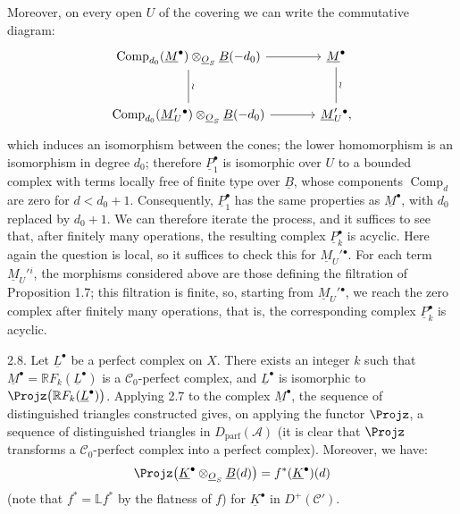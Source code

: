 Moreover, on every open $U$ of the covering we can write the commutative diagram:
\[
\begin{tikzcd}[column sep=large,row sep=large]
\operatorname{Comp}_{d_0}(\underline{M}^{\bullet})\otimes_{\underline{O}_S}\underline{B}(-d_0) \arrow[r] \arrow[d,dash,"\wr"] & \underline{M}^{\bullet} \arrow[d,dash,"\wr"]\\
\operatorname{Comp}_{d_0}(\underline{M}_U'{}^{\bullet})\otimes_{\underline{O}_S}\underline{B}(-d_0) \arrow[r] & \underline{M}_U'{}^{\bullet},
\end{tikzcd}
\]
which induces an isomorphism between the cones; the lower homomorphism is an isomorphism in degree $d_0$; therefore $\underline{P}_1^{\bullet}$ is isomorphic over $U$ to a bounded complex with terms locally free of finite type over $\underline{B}$, whose components $\operatorname{Comp}_d$ are zero for $d<d_0+1$. Consequently, $\underline{P}_1^{\bullet}$ has the same properties as $\underline{M}^{\bullet}$, with $d_0$ replaced by $d_0+1$. We can therefore iterate the process, and it suffices to see that, after finitely many operations, the resulting complex $\underline{P}_k^{\bullet}$ is acyclic. Here again the question is local, so it suffices to check this for $\underline{M}_U'{}^{\bullet}$. For each term $\underline{M}_U'{}^i$, the morphisms considered above are those defining the filtration of Proposition 1.7; this filtration is finite, so, starting from $\underline{M}_U'{}^{\bullet}$, we reach the zero complex after finitely many operations, that is, the corresponding complex $\underline{P}_k^{\bullet}$ is acyclic.

%
2.8.
Let $\underline{L}^{\bullet}$ be a perfect complex on $X$. There exists an integer $k$ such that $\underline{M}^{\bullet}=\mathbb R F_k(\underline{L}^{\bullet})$ is a $\mathcal C_0$-perfect complex, and $\underline{L}^{\bullet}$ is isomorphic to $\Projz\bigl(\mathbb R F_k(\underline{L}^{\bullet})\bigr)$. Applying 2.7 to the complex $\underline{M}^{\bullet}$, the sequence of distinguished triangles constructed gives, on applying the functor $\Projz$, a sequence of distinguished triangles in $D_{\mathrm{parf}}(\mathcal A)$ (it is clear that $\Projz$ transforms a $\mathcal C_0$-perfect complex into a perfect complex). Moreover, we have:
\[
  \Projz\bigl(\underline{K}^{\bullet}\otimes_{\underline{O}_S}\underline{B}(d)\bigr)
  = f^*(\underline{K}^{\bullet})(d)
\]
(note that $f^*=\mathbb L f^*$ by the flatness of $f$) for $\underline{K}^{\bullet}$ in $D^+(\mathcal C')$.

